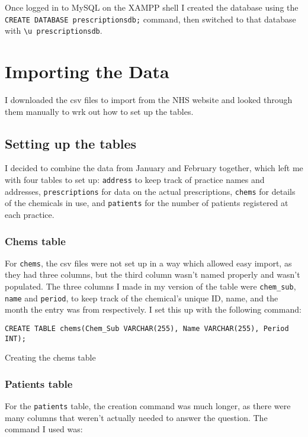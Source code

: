 \documentclass{report}
\begin{document}
Once logged in to MySQL on the XAMPP shell I created the database using the \texttt{CREATE DATABASE prescriptionsdb;} command, then switched to that database with \texttt{\textbackslash u prescriptionsdb}.
\chapter{Importing the Data}
I downloaded the csv files to import from the NHS website \cite{nhsprescriptiondata, nhspatientdata} and looked through them manually to wrk out how to set up the tables.

\section{Setting up the tables}
I decided to combine the data from January and February together, which left me with four tables to set up: \texttt{address} to keep track of practice names and addresses, \texttt{prescriptions} for data on the actual prescriptions, \texttt{chems} for details of the chemicals in use, and \texttt{patients} for the number of patients registered at each practice.

\subsection{Chems table}
For \texttt{chems}, the csv files were not set up in a way which allowed easy import, as they had three columns, but the third column wasn't named properly and wasn't populated. The three columns I made in my version of the table were \texttt{chem\_sub}, \texttt{name} and \texttt{period}, to keep track of the chemical's unique ID, name, and the month the entry was from respectively. I set this up with the following command:

\begin{listing}[H]
\begin{verbatim}
CREATE TABLE chems(Chem_Sub VARCHAR(255), Name VARCHAR(255), Period INT);
\end{verbatim}
\caption{Creating the chems table}
\label{lst: creating chems table}
\end{listing}

\subsection{Patients table}
For the \texttt{patients} table, the creation command was much longer, as there were many columns that weren't actually needed to answer the question. The command I used was:
\end{document}
